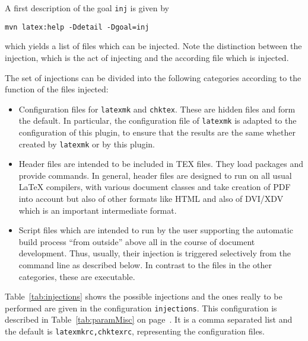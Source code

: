 A first description of the goal \texttt{inj} is given by 
%
\begin{verbatim}
mvn latex:help -Ddetail -Dgoal=inj
\end{verbatim}
%
which yields a list of files which can be injected. 
Note the distinction between the injection, which is the act of injecting 
and the according file which is injected. 

The set of injections can be divided into the following categories 
according to the function of the files injected: 
%
\begin{itemize}
  \item
  Configuration files for \texttt{latexmk} and \texttt{chktex}. 
  These are hidden files and form the default. 
  In particular, the configuration file of \texttt{latexmk} 
  is adapted to the configuration of this plugin, 
  to ensure that the results are the same whether created by \texttt{latexmk} 
  or by this plugin. 
  \item
  Header files are intended to be included in TEX files. 
  They load packages and provide commands. 
  In general, header files are designed to run on all usual \LaTeX{} compilers, 
  with various document classes  
  and take creation of PDF into account but also of other formats like HTML 
  and also of DVI/XDV which is an important intermediate format. 
  \item
  Script files which are intended to run by the user 
  supporting the automatic build process ``from outside''
  above all in the course of document development. 
  Thus, usually, their injection is triggered selectively from the command line 
  as described below. 
  In contrast to the files in the other categories, these are executable. 
\end{itemize}

Table~\ref{tab:injections} shows the possible injections 
and the ones really to be performed are given in the configuration \texttt{injections}. 
This configuration is described in Table~\ref{tab:paramMisc} on page~\pageref{tab:paramMisc}. 
It is a comma separated list and the default is \texttt{latexmkrc,chktexrc}, 
representing the configuration files. 


